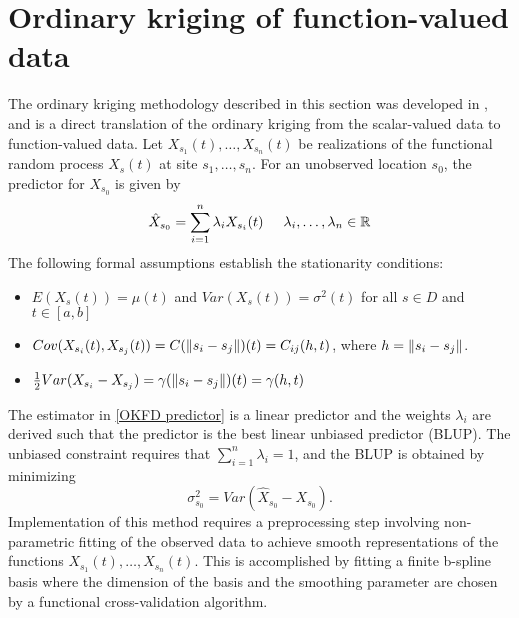 \section{Ordinary kriging of function-valued data} %
\label{sec:ordinary_kriging_of_function_valued_data}
The ordinary kriging methodology described in this section was developed in \cite{Giraldo:2010jx}, and is a direct translation of the ordinary kriging from the scalar-valued data to function-valued data. Let $X_{s_1}(t), \dots, X_{s_n}(t)$ be realizations of the functional random process $X_s(t)$ at site $s_1, \dots, s_n$. For an unobserved location $s_0$, the predictor for $X_{s_0}$ is given by 
\begin{equation}
	\hat{X}_{s_0} = \sum_{i=1}^n\lambda_i X_{s_i}(t) \mbox{\hspace{0.5cm}} \lambda_i, \dots, \lambda_n \in \mathbb{R} \label{OKFD predictor}
\end{equation}
The following formal assumptions establish the stationarity conditions:
\begin{itemize}
	\item $E(X_s(t)) = \mu(t)$ and $Var(X_s(t)) = \sigma^2(t)$ for all $s \in D$ and $t \in [a,b]$
	\item $Cov(X_{s_i}(t), X_{s_j}(t)) = C(\left\|s_i - s_j\right\|)(t) = C_{ij}(h,t)$, where $h = \left\|s_i - s_j\right\|$.
	\item $\frac{1}{2}Var(X_{s_i} - X_{s_j}) = \gamma(\left\|s_i - s_j\right\|)(t) = \gamma(h,t)$
\end{itemize}
The estimator in \eqref{OKFD predictor} is a linear predictor and the weights $\lambda_i$ are derived such that the predictor is the best linear unbiased predictor (BLUP). The unbiased constraint requires that $\sum_{i=1}^n\lambda_i = 1$, and the BLUP is obtained by minimizing
\begin{equation}
	\sigma^2_{s_0} = Var(\hat{X}_{s_0} - X_{s_0}).
\end{equation}
Implementation of this method requires a preprocessing step involving non-parametric fitting of the observed data to achieve smooth representations of the functions $X_{s_1}(t), \dots, X_{s_n}(t)$. This is accomplished by fitting a finite b-spline basis where the dimension of the basis and the smoothing parameter are chosen by a functional cross-validation algorithm. 

